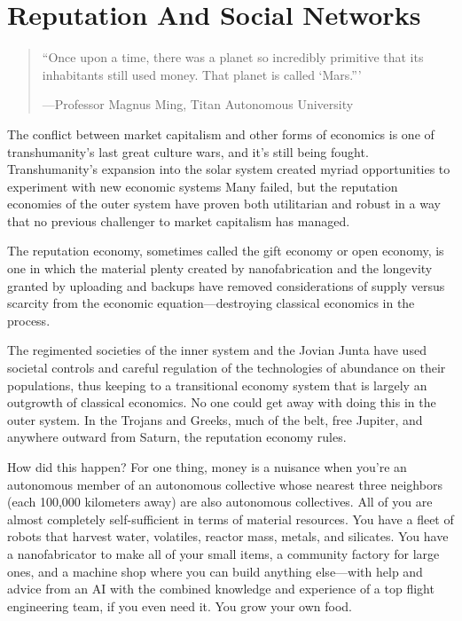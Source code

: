 \section{Reputation And Social Networks}

\begin{quote}
``Once upon a time, there was a planet so incredibly primitive that its 
inhabitants still used money. That planet is called ‘Mars.'''

—Professor Magnus Ming, Titan Autonomous University
\end{quote}

The conflict between market capitalism and other forms of economics
is one of transhumanity's last great culture wars, and it's
still being fought. Transhumanity's expansion into the solar system 
created myriad opportunities to experiment with new economic systems
Many failed, but the reputation economies of the outer system
have proven both utilitarian and robust in a way that no previous 
challenger to market capitalism has managed.

The reputation economy, sometimes called the gift economy or 
open economy, is one in which the material plenty created by nanofabrication
and the longevity granted by uploading and backups
have removed considerations of supply versus scarcity from the 
economic equation—destroying classical economics in the process.

The regimented societies of the inner system and the Jovian 
Junta have used societal controls and careful regulation of the 
technologies of abundance on their populations, thus keeping to a 
transitional economy system that is largely an outgrowth of classical
economics. No one could get away with doing this in the outer
system. In the Trojans and Greeks, much of the belt, free Jupiter, and 
anywhere outward from Saturn, the reputation economy rules.

How did this happen? For one thing, money is a nuisance when 
you're an autonomous member of an autonomous collective whose 
nearest three neighbors (each 100,000 kilometers away) are also 
autonomous collectives. All of you are almost completely self-sufficient
in terms of material resources. You have a fleet of robots
that harvest water, volatiles, reactor mass, metals, and silicates. You 
have a nanofabricator to make all of your small items, a community 
factory for large ones, and a machine shop where you can build 
anything else—with help and advice from an AI with the combined 
knowledge and experience of a top flight engineering team, if you 
even need it. You grow your own food.

